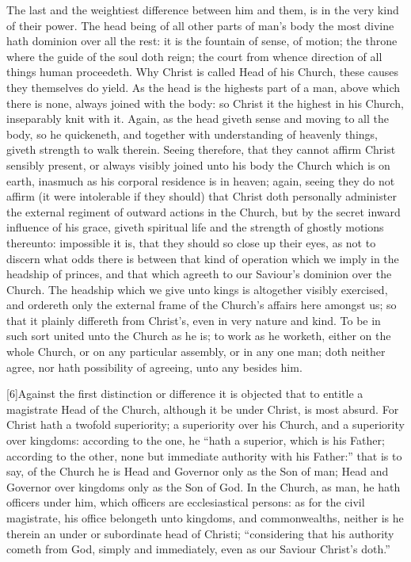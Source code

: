The last and the weightiest difference between him and them, is in the very kind of their power. The head being of all other parts of man’s body the most divine hath dominion over all the rest: it is the fountain of sense, of motion; the throne where the guide of the soul doth reign; the court from whence direction of all things human proceedeth.  Why Christ is called Head of his Church, these causes they themselves do yield. As the head is the highests part of a man, above which there is none, always joined with the body: so Christ it the highest in his Church, inseparably knit with it. Again, as the head giveth sense and moving to all the body, so he quickeneth, and together with understanding of heavenly things, giveth strength to walk therein. Seeing therefore, that they cannot affirm Christ sensibly present, or always visibly joined unto his body the Church which is on earth, inasmuch as his corporal residence is in heaven; again, seeing they do not affirm (it were intolerable if they should) that Christ doth personally administer the external regiment of outward actions in the Church, but by the secret inward influence of his grace, giveth spiritual life and the strength of ghostly motions thereunto: impossible it is, that they should so close up their eyes, as not to discern what odds there is between that kind of operation which we imply in the headship of princes, and that which agreeth to our Saviour’s dominion over the Church. The headship which we give unto kings is altogether visibly exercised, and ordereth only the external frame of the Church’s affairs here amongst us; so that it plainly differeth from Christ’s, even in very nature and kind. To be in such sort united unto the Church as he is; to work as he worketh, either on the whole Church, or on any particular assembly, or in any one man; doth neither agree, nor hath possibility of agreeing, unto any besides him.

[6]Against the first distinction or difference it is objected that to entitle a magistrate Head of the Church, although it be under Christ, is most absurd. For Christ hath a twofold superiority; a superiority over his Church, and a superiority over kingdoms: according to the one, he “hath a superior, which is his Father; according to the other, none but immediate authority with his Father:” that is to  say, of the Church he is Head and Governor only as the Son of man; Head and Governor over kingdoms only as the Son of God. In the Church, as man, he hath officers under him, which officers are ecclesiastical persons: as for the civil magistrate, his office belongeth unto kingdoms, and commonwealths, neither is he therein an under or subordinate head of Christi; “considering that his authority cometh from God, simply and immediately, even as our Saviour Christ’s doth.”

